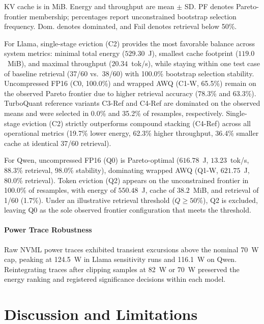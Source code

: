 \documentclass[conference,a4paper]{IEEEtran}
\begin{document}
\begin{table}[t]
\vspace{1pt}
\raggedright\footnotesize KV cache is in MiB. Energy and throughput are mean $\pm$ SD. PF denotes Pareto-frontier membership; percentages report unconstrained bootstrap selection frequency. Dom. denotes dominated, and Fail denotes retrieval below 50\%.\par
\end{table}

For Llama, single-stage eviction (C2) provides the most favorable balance across system metrics: minimal total energy ($529.30$~J), smallest cache footprint ($119.0$~MiB), and maximal throughput ($20.34$~tok/s), while staying within one test case of baseline retrieval (37/60 vs.\ 38/60) with 100.0\% bootstrap selection stability. Uncompressed FP16 (C0, 100.0\%) and wrapped AWQ (C1-W, 65.5\%) remain on the observed Pareto frontier due to higher retrieval accuracy (78.3\% and 63.3\%). TurboQuant reference variants C3-Ref and C4-Ref are dominated on the observed means and were selected in 0.0\% and 35.2\% of resamples, respectively. Single-stage eviction (C2) strictly outperforms compound stacking (C4-Ref) across all operational metrics (19.7\% lower energy, 62.3\% higher throughput, 36.4\% smaller cache at identical 37/60 retrieval).

For Qwen, uncompressed FP16 (Q0) is Pareto-optimal ($616.78$~J, $13.23$~tok/s, 88.3\% retrieval, 98.0\% stability), dominating wrapped AWQ (Q1-W, $621.75$~J, 80.0\% retrieval). Token eviction (Q2) appears on the unconstrained frontier in 100.0\% of resamples, with energy of $550.48$~J, cache of $38.2$~MiB, and retrieval of 1/60 (1.7\%). Under an illustrative retrieval threshold ($Q \ge 50\%$), Q2 is excluded, leaving Q0 as the sole observed frontier configuration that meets the threshold.

\paragraph{Power Trace Robustness}
Raw NVML power traces exhibited transient excursions above the nominal 70~W cap, peaking at 124.5~W in Llama sensitivity runs and 116.1~W on Qwen. Reintegrating traces after clipping samples at 82~W or 70~W preserved the energy ranking and registered significance decisions within each model.

\section{Discussion and Limitations}
\end{document}
